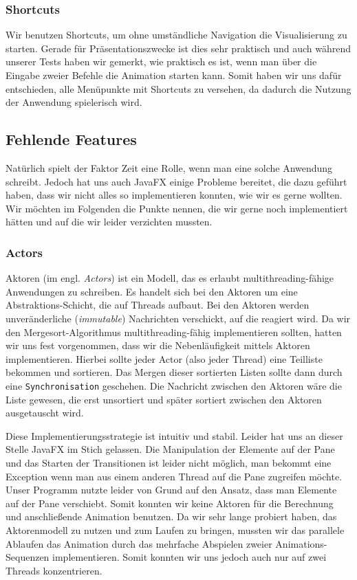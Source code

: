 \subsubsection{Shortcuts}
Wir benutzen Shortcuts, um ohne umständliche Navigation die Visualisierung zu starten. Gerade für Präsentationszwecke ist dies sehr praktisch und auch während unserer Tests haben wir gemerkt, wie praktisch es ist, wenn man über die Eingabe zweier Befehle die Animation starten kann. Somit haben wir uns dafür entschieden, alle Menüpunkte mit Shortcuts zu versehen, da dadurch die Nutzung der Anwendung spielerisch wird.

\subsection{Fehlende Features}
Natürlich spielt der Faktor Zeit eine Rolle, wenn man eine solche Anwendung schreibt. Jedoch hat uns auch JavaFX einige Probleme bereitet, die dazu geführt haben, dass wir nicht alles so implementieren konnten, wie wir es gerne wollten. Wir möchten im Folgenden die Punkte nennen, die wir gerne noch implementiert hätten und auf die wir leider verzichten mussten.

\subsubsection{Actors}\label{sec:probleme-mit-aktoren}
Aktoren (im engl. \textit{Actors}) ist ein Modell, das es erlaubt multithreading-fähige Anwendungen zu schreiben. Es handelt sich bei den Aktoren um eine Abstraktions-Schicht, die auf Threads aufbaut. Bei den Aktoren werden unveränderliche (\textit{immutable}) Nachrichten verschickt, auf die reagiert wird. Da wir den Mergesort-Algorithmus multithreading-fähig implementieren sollten, hatten wir uns fest vorgenommen, dass wir die Nebenläufigkeit mittels Aktoren implementieren. Hierbei sollte jeder Actor (also jeder Thread) eine Teilliste bekommen und sortieren. Das Mergen dieser sortierten Listen sollte dann durch eine \texttt{Synchronisation} geschehen. Die Nachricht zwischen den Aktoren wäre die Liste gewesen, die erst unsortiert und später sortiert zwischen den Aktoren ausgetauscht wird.

Diese Implementierungsstrategie ist intuitiv und stabil. Leider hat uns an dieser Stelle JavaFX im Stich gelassen. Die Manipulation der Elemente auf der Pane und das Starten der Transitionen ist leider nicht möglich, man bekommt eine Exception wenn man aus einem anderen Thread auf die Pane zugreifen möchte. Unser Programm nutzte leider von Grund auf den Ansatz, dass man Elemente auf der Pane verschiebt. Somit konnten wir keine Aktoren für die Berechnung und anschließende Animation benutzen. Da wir sehr lange probiert haben, das Aktorenmodell zu nutzen und zum Laufen zu bringen, mussten wir das parallele Ablaufen das Animation durch das mehrfache Abspielen zweier Animations-Sequenzen implementieren. Somit konnten wir uns jedoch auch nur auf zwei Threads konzentrieren.

